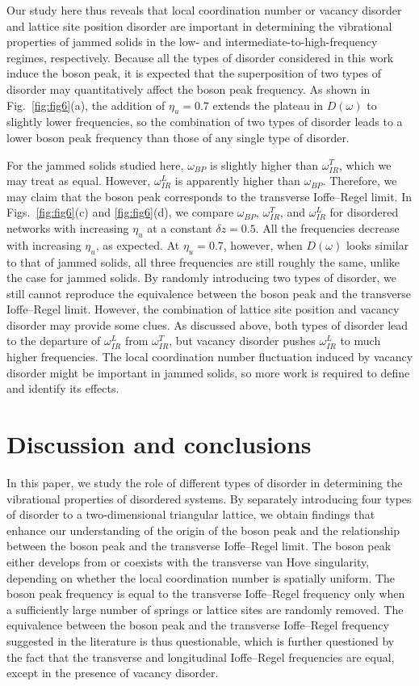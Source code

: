 \documentclass[twocolumn,printnumbers,amsmath,amssymb,prl,verbatim]{revtex4}
\begin{document}
Our study here thus reveals that local coordination number or vacancy disorder and lattice site position disorder are important in determining the vibrational properties of jammed solids in the low- and intermediate-to-high-frequency regimes, respectively. Because all the types of disorder considered in this work induce the boson peak, it is expected that the superposition of two types of disorder may quantitatively affect the boson peak frequency. As shown in Fig.~\ref{fig:fig6}(a), the addition of $\eta_u=0.7$ extends the plateau in $D(\omega)$ to slightly lower frequencies, so the combination of two types of disorder leads to a lower boson peak frequency than those of any single type of disorder.

For the jammed solids studied here, $\omega_{BP}$ is slightly higher than $\omega_{IR}^T$, which we may treat as equal. However, $\omega_{IR}^L$ is apparently higher than $\omega_{BP}$. Therefore, we may claim that the boson peak corresponds to the transverse Ioffe--Regel limit. In Figs.~\ref{fig:fig6}(c) and \ref{fig:fig6}(d), we compare $\omega_{BP}$, $\omega_{IR}^T$, and $\omega_{IR}^L$ for disordered networks with increasing $\eta_u$ at a constant $\delta z=0.5$. All the frequencies decrease with increasing $\eta_u$, as expected. At $\eta_u=0.7$, however, when $D(\omega)$ looks similar to that of jammed solids, all three frequencies are still roughly the same, unlike the case for jammed solids. By randomly introducing two types of disorder, we still cannot reproduce the equivalence between the boson peak and the transverse Ioffe--Regel limit. However, the combination of lattice site position and vacancy disorder may provide some clues. As discussed above, both types of disorder lead to the departure of $\omega_{IR}^L$ from $\omega_{IR}^T$, but vacancy disorder pushes $\omega_{IR}^L$ to much higher frequencies. The local coordination number fluctuation induced by vacancy disorder might be important in jammed solids, so more work is required to define and identify its effects.

\section{Discussion and conclusions}

In this paper, we study the role of different types of disorder in determining the vibrational properties of disordered systems. By separately introducing four types of disorder to a two-dimensional triangular lattice, we obtain findings that enhance our understanding of the origin of the boson peak and the relationship between the boson peak and the transverse Ioffe--Regel limit. The boson peak either develops from or coexists with the transverse van Hove singularity, depending on whether the local coordination number is spatially uniform. The boson peak frequency is equal to the transverse Ioffe--Regel frequency only when a sufficiently large number of springs or lattice sites are randomly removed. The equivalence between the boson peak and the transverse Ioffe--Regel frequency suggested in the literature is thus questionable, which is further questioned by the fact that the transverse and longitudinal Ioffe--Regel frequencies are equal, except in the presence of vacancy disorder.
\end{document}
